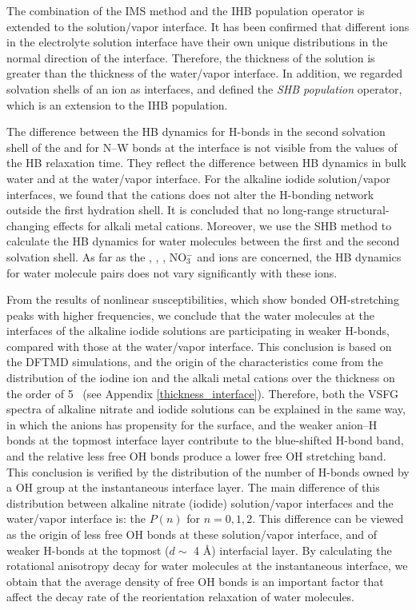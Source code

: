 The combination of the IMS method and the IHB population operator is extended to the solution/vapor interface. 
It has been confirmed that different ions in the electrolyte solution interface have their own unique distributions in the normal direction of the interface. 
Therefore, the thickness of the solution is greater than the thickness of the water/vapor interface. 
In addition, we regarded solvation shells of an ion as interfaces, 
and defined the \emph{SHB population} operator, which is an extension to the IHB population.

The difference between the HB dynamics for H-bonds in the second solvation shell of the \Li and for N--W bonds 
at the interface is not visible from the values of the HB relaxation time. They reflect the difference between HB dynamics in 
bulk water and at the water/vapor interface. For the alkaline iodide solution/vapor interfaces, we found 
that the cations does not alter the H-bonding network outside the first hydration shell. 
It is concluded that no long-range structural-changing effects for alkali metal cations.
Moreover, we use the SHB method to calculate the HB dynamics for water molecules between the first and the second solvation shell.
As far as the \Li, \Na, \K, NO$^-_3$ and \I ions are concerned, 
the HB dynamics for water molecule pairs does not vary significantly with these ions.

From the results of nonlinear susceptibilities, which show bonded OH-stretching peaks with higher frequencies, 
we conclude that the water molecules at the interfaces of the alkaline iodide solutions are participating 
in weaker H-bonds, compared with those at the water/vapor interface. 
This conclusion is based on the DFTMD simulations, and %
the origin of the characteristics come from the distribution of the iodine ion and the alkali metal cations
over the thickness on the order of 5 \A\ (see Appendix \ref{thickness_interface}).
Therefore, both the VSFG spectra of alkaline nitrate and iodide solutions can be explained in the same way, 
in which the anions has propensity for the surface, and the weaker anion--H bonds at the topmost interface layer contribute to the blue-shifted H-bond band,
and the relative less free OH bonds produce a lower free OH stretching band.
This conclusion is verified by the distribution of the number of H-bonds owned by a OH group at the instantaneous interface layer. 
The main difference of this distribution between alkaline nitrate (iodide) solution/vapor interfaces and the water/vapor interface is:
the $P(n)$ for $n= 0, 1, 2$. This difference can be viewed as the origin of less free OH bonds at these solution/vapor interface, 
and of weaker H-bonds at the topmost ($d \sim$ 4 \AA) interfacial layer.
By calculating the rotational anisotropy decay for water molecules at the instantaneous interface, 
we obtain that the average density of free OH bonds is an important factor that affect the decay rate of the reorientation relaxation of water molecules.

